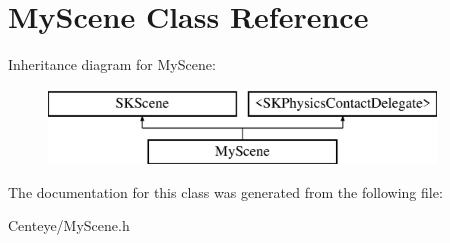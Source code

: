 \hypertarget{interface_my_scene}{\section{My\+Scene Class Reference}
\label{interface_my_scene}
}
Inheritance diagram for My\+Scene\+:\begin{figure}[H]
\begin{center}
\leavevmode
\includegraphics[height=2.000000cm]{interface_my_scene}
\end{center}
\end{figure}


The documentation for this class was generated from the following file\+:\begin{DoxyCompactItemize}
\item 
Centeye/My\+Scene.\+h\end{DoxyCompactItemize}
